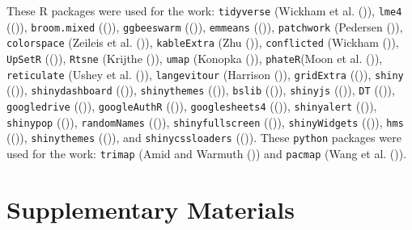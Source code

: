 \documentclass[
  11pt,
  a4paper,
]{report}
\begin{document}
These R packages were used for the work: \texttt{tidyverse} (Wickham et
al. ()), \texttt{lme4}
(()),
\texttt{broom.mixed} (()),
\texttt{ggbeeswarm} (()),
\texttt{emmeans} (()),
\texttt{patchwork} (Pedersen ()),
\texttt{colorspace} (Zeileis et al. ()),
\texttt{kableExtra} (Zhu ()),
\texttt{conflicted} (Wickham ()),
\texttt{UpSetR} (()),
\texttt{Rtsne} (Krijthe ()), \texttt{umap}
(Konopka ()), \texttt{phateR}(Moon et al.
()), \texttt{reticulate} (Ushey et al.
()), \texttt{langevitour} (Harrison
()), \texttt{gridExtra}
(()), \texttt{shiny}
(()),
\texttt{shinydashboard}
(()),
\texttt{shinythemes}
(()), \texttt{bslib}
(()), \texttt{shinyjs}
(()), \texttt{DT}
(()), \texttt{googledrive}
(()), \texttt{googleAuthR}
(()), \texttt{googlesheets4}
(()),
\texttt{shinyalert} (()),
\texttt{shinypop} (()),
\texttt{randomNames}
(()),
\texttt{shinyfullscreen}
(()),
\texttt{shinyWidgets}
(()), \texttt{hms}
(()),
\texttt{shinythemes}
(()), and
\texttt{shinycssloaders}
(()). These \texttt{python}
packages were used for the work: \texttt{trimap} (Amid and Warmuth
()) and \texttt{pacmap} (Wang et al.
()).

\section{Supplementary Materials}\label{supplementary-materials}
\end{document}
